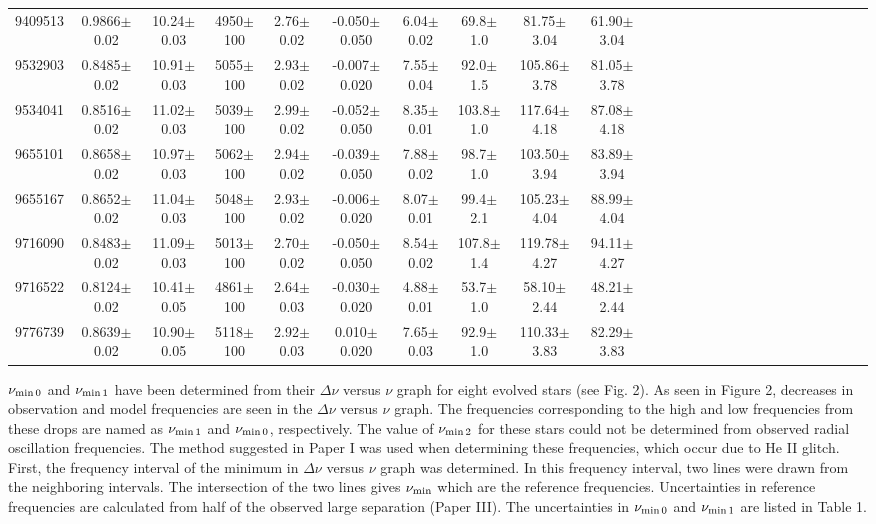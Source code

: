 \documentclass[a4paper,fleqn,usenatbib]{mnras}     %
\begin{document}
{\begin{table*}
\begin{tabular}{lccccccccccccccccccccccrrr}
9409513&0.9866$\pm$0.02&10.24$\pm$0.03&4950$\pm$100&2.76$\pm$0.02&-0.050$\pm$0.050&6.04$\pm$0.02&69.8$\pm$1.0&81.75$\pm$3.04&61.90$\pm$3.04\\[2.0pt]
9532903&0.8485$\pm$0.02&10.91$\pm$0.03&5055$\pm$100&2.93$\pm$0.02&-0.007$\pm$0.020&7.55$\pm$0.04&92.0$\pm$1.5&105.86$\pm$3.78&81.05$\pm$3.78\\[2.0pt]
9534041&0.8516$\pm$0.02&11.02$\pm$0.03&5039$\pm$100&2.99$\pm$0.02&-0.052$\pm$0.050&8.35$\pm$0.01&103.8$\pm$1.0&117.64$\pm$4.18&87.08$\pm$4.18\\[2.0pt]
9655101&0.8658$\pm$0.02&10.97$\pm$0.03&5062$\pm$100&2.94$\pm$0.02&-0.039$\pm$0.050&7.88$\pm$0.02&98.7$\pm$1.0&103.50$\pm$3.94&83.89$\pm$3.94\\[2.0pt]
9655167&0.8652$\pm$0.02&11.04$\pm$0.03&5048$\pm$100&2.93$\pm$0.02&-0.006$\pm$0.020&8.07$\pm$0.01&99.4$\pm$2.1&105.23$\pm$4.04&88.99$\pm$4.04\\[2.0pt]
9716090&0.8483$\pm$0.02&11.09$\pm$0.03&5013$\pm$100&2.70$\pm$0.02&-0.050$\pm$0.050&8.54$\pm$0.02&107.8$\pm$1.4&119.78$\pm$4.27&94.11$\pm$4.27\\[2.0pt]
9716522&0.8124$\pm$0.02&10.41$\pm$0.05&4861$\pm$100&2.64$\pm$0.03&-0.030$\pm$0.020&4.88$\pm$0.01&53.7$\pm$1.0&58.10$\pm$2.44&48.21$\pm$2.44\\[2.0pt]
9776739&0.8639$\pm$0.02&10.90$\pm$0.05&5118$\pm$100&2.92$\pm$0.03&0.010$\pm$0.020&7.65$\pm$0.03&92.9$\pm$1.0&110.33$\pm$3.83&82.29$\pm$3.83\\[2.0pt]
               \hline
        \end{tabular}
\end{table*}

$\nu_{\rm \min0}$ and $\nu_{\rm \min1}$ have been determined 
from their $\Delta\nu$ versus $\nu$ graph
 for eight evolved stars (see Fig. 2). 
 As seen in Figure 2, decreases in 
observation and model frequencies are seen in 
the $\Delta\nu$ versus $\nu$ graph. The frequencies corresponding 
to the high and low frequencies from these drops
 are named as $\nu_{\rm \min1}$ and 
$\nu_{\rm \min0}$, respectively.
The value of $\nu_{\rm \min2}$ for these stars could not 
be determined from observed radial oscillation frequencies.
The method suggested in Paper I 
was used when determining these frequencies, which occur 
due to He II glitch.
First, the
frequency interval of the 
minimum in 
 $\Delta\nu$ versus $\nu$ graph was determined. 
In this frequency interval, two lines were 
drawn from the neighboring intervals.
The intersection of the two lines 
gives $\nu_{\rm \min}$ which are the reference frequencies.
Uncertainties in reference frequencies are 
calculated from half of the observed large separation (Paper III).
The uncertainties in $\nu_{\rm \min0}$ and $\nu_{\rm \min1}$ 
are listed in Table 1.


}
\end{document}
